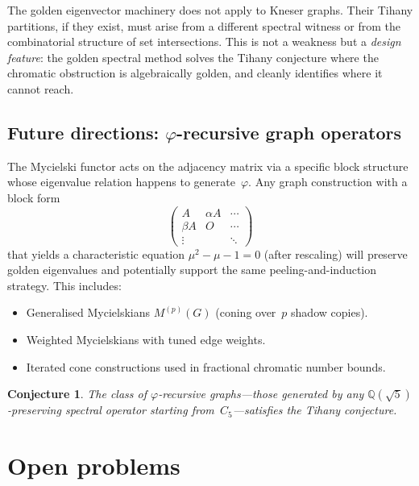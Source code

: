 \documentclass[11pt,a4paper]{amsart}
\theoremstyle{plain}
\newtheorem{conjecture}[theorem]{Conjecture}
\theoremstyle{definition}
\theoremstyle{remark}
\newcommand{\Q}{\mathbb{Q}}
\newcommand{\vp}{\varphi}
\begin{document}
The golden eigenvector machinery does not apply to Kneser graphs.  Their Tihany
partitions, if they exist, must arise from a different spectral witness or from
the combinatorial structure of set intersections.  This is not a weakness but a
\emph{design feature}: the golden spectral method solves the Tihany conjecture
where the chromatic obstruction is algebraically golden, and cleanly identifies
where it cannot reach.

\subsection{Future directions: \texorpdfstring{$\vp$}{φ}-recursive graph
operators}

The Mycielski functor acts on the adjacency matrix via a specific block
structure whose eigenvalue relation happens to generate~$\vp$.  Any graph
construction with a block form
\[
  \begin{pmatrix} A & \alpha A & \cdots \\ \beta A & O & \cdots \\ \vdots & & \ddots \end{pmatrix}
\]
that yields a characteristic equation $\mu^2 - \mu - 1 = 0$ (after rescaling)
will preserve golden eigenvalues and potentially support the same
peeling-and-induction strategy.  This includes:
\begin{itemize}
\item Generalised Mycielskians $M^{(p)}(G)$ (coning over~$p$ shadow copies).
\item Weighted Mycielskians with tuned edge weights.
\item Iterated cone constructions used in fractional chromatic number bounds.
\end{itemize}

\begin{conjecture}\label{conj:phi-recursive}
The class of $\vp$-recursive graphs---those generated by any
$\Q(\sqrt{5})$-preserving spectral operator starting from~$C_5$---satisfies
the Tihany conjecture.
\end{conjecture}

\section{Open problems}\label{sec:open}
\end{document}
